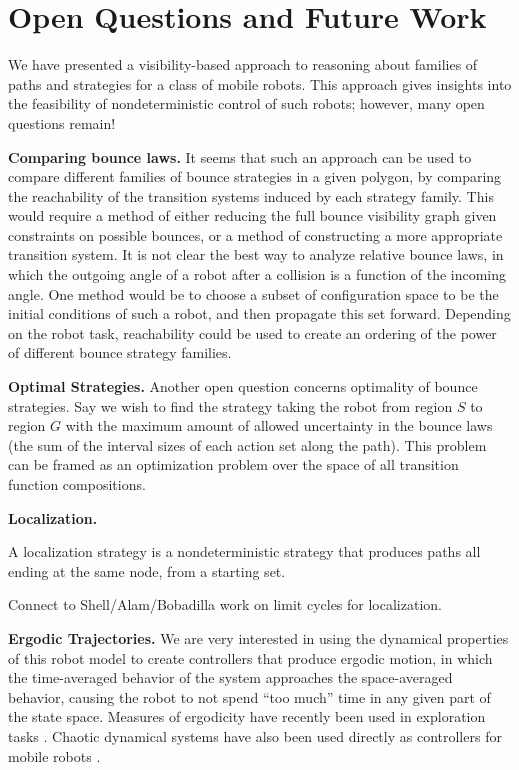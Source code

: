 \documentclass[]{styles/svproc}  %
\begin{document}
\section{Open Questions and Future Work}

We have presented a visibility-based approach to reasoning about families of
paths and strategies for a class of mobile robots. This approach gives insights
 into the feasibility of nondeterministic control of such robots; however, many open
questions remain!

\textbf{Comparing bounce laws.} It seems that such an approach can be used to compare different families of
bounce strategies in a given polygon, by comparing the reachability of the
transition systems induced by each strategy family. This would require a
method of either reducing the full bounce visibility graph given constraints on
possible bounces, or a method of constructing a more appropriate transition
system. It is not clear the best way to analyze relative bounce laws, in which the
outgoing angle of a robot after a collision is a function of the incoming angle.
One method would be to choose a subset of configuration space to be the initial
conditions of such a robot, and then propagate this set forward. Depending on
the robot task, reachability could be used to create an ordering of the power of
different bounce strategy families.

\textbf{Optimal Strategies.} Another open question concerns optimality of bounce strategies. Say we wish to
find the strategy taking the robot from region $S$ to region $G$ with the
maximum amount of allowed uncertainty in the bounce laws (the sum of the
interval sizes of each action set along the path). This problem can be framed as
an optimization problem over the space of all transition function compositions.

\textbf{Localization.}

\begin{definition}
A localization strategy is a nondeterministic strategy that produces paths all
ending at the same node, from a starting set.
\end{definition}

Connect to Shell/Alam/Bobadilla work on limit cycles for localization.

\textbf{Ergodic Trajectories.} 
We are very interested in using the dynamical properties of this robot model to
create controllers that produce ergodic motion, in which the time-averaged
behavior of the system approaches the space-averaged behavior, causing the robot
to not spend ``too much'' time in any given part of the state space. Measures
of ergodicity have recently been used in exploration tasks
\cite{miller2016ergodic}. Chaotic dynamical systems have also been used directly
as controllers for mobile robots \cite{nakamura2001chaotic}.
\end{document}
